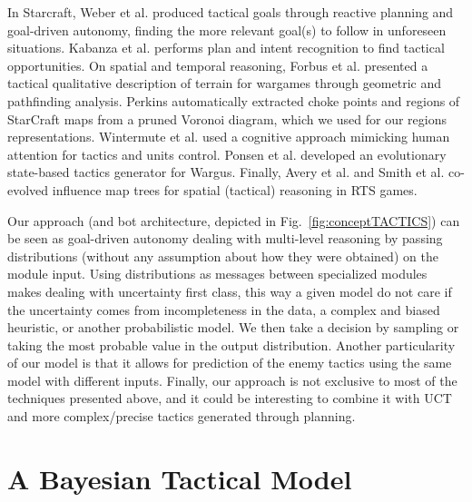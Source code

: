 In Starcraft, Weber et al. \cite{Weber2010cr,WeberCIG10} produced tactical goals through reactive planning and goal-driven autonomy, finding the more relevant goal(s) to follow in unforeseen situations. Kabanza et al. \cite{OBRecog} performs plan and intent recognition to find tactical opportunities. %
On spatial and temporal reasoning, Forbus et al. \cite{Forbus2002} presented a tactical qualitative description of terrain for wargames through geometric and pathfinding analysis. Perkins \cite{Perkins2010} automatically extracted choke points and regions of StarCraft maps from a pruned Voronoi diagram, which we used for our regions representations. Wintermute et al. \cite{SORTS} used a cognitive approach mimicking human attention for tactics and units control. Ponsen et al. \cite{PonsenMSA06} developed an evolutionary state-based tactics generator for Wargus. %
Finally, Avery et al. \cite{Avery09} and Smith et al. \cite{SmithCIG10} co-evolved influence map trees for spatial (tactical) reasoning in RTS games. 

Our approach (and bot architecture, depicted in Fig.~\ref{fig:conceptTACTICS}) can be seen as goal-driven autonomy \cite{Weber2010cr} dealing with multi-level reasoning by passing distributions (without any assumption about how they were obtained) on the module input. Using distributions as messages between specialized modules makes dealing with uncertainty first class, this way a given model do not care if the uncertainty comes from incompleteness in the data, a complex and biased heuristic, or another probabilistic model. We then take a decision by sampling or taking the most probable value in the output distribution. Another particularity of our model is that it allows for prediction of the enemy tactics using the same model with different inputs. Finally, our approach is not exclusive to most of the techniques presented above, and it could be interesting to combine it with UCT \cite{Balla_uctfor} and more complex/precise tactics generated through planning.

\section{A Bayesian Tactical Model}
